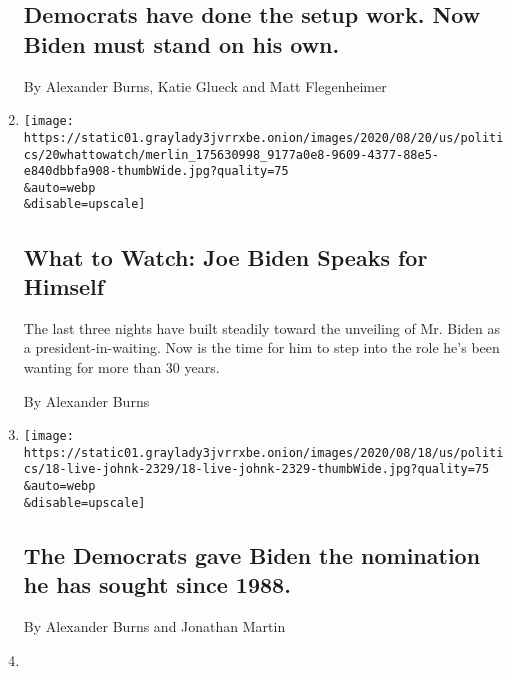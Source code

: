 \begin{enumerate}
  \hypertarget{democrats-have-done-the-setup-work-now-biden-must-stand-on-his-own}{%
  \subsection{Democrats have done the setup work. Now Biden must stand
  on his
  own.}\label{democrats-have-done-the-setup-work-now-biden-must-stand-on-his-own}}

  By Alexander Burns, Katie Glueck and Matt Flegenheimer
\item
  \href{/2020/08/20/us/politics/democratic-national-convention-guide.html}{}

  \texttt{[image: https://static01.graylady3jvrrxbe.onion/images/2020/08/20/us/politics/20whattowatch/merlin\_175630998\_9177a0e8-9609-4377-88e5-e840dbbfa908-thumbWide.jpg?quality=75\\\&auto=webp\\\&disable=upscale]}

  \hypertarget{what-to-watch-joe-biden-speaks-for-himself-1}{%
  \subsection{What to Watch: Joe Biden Speaks for
  Himself}\label{what-to-watch-joe-biden-speaks-for-himself-1}}

  The last three nights have built steadily toward the unveiling of Mr.
  Biden as a president-in-waiting. Now is the time for him to step into
  the role he's been wanting for more than 30 years.

  By Alexander Burns
\item
  \href{/2020/08/19/us/elections/the-democrats-gave-biden-the-nomination-he-has-sought-since-1988.html}{}

  \texttt{[image: https://static01.graylady3jvrrxbe.onion/images/2020/08/18/us/politics/18-live-johnk-2329/18-live-johnk-2329-thumbWide.jpg?quality=75\\\&auto=webp\\\&disable=upscale]}

  \hypertarget{the-democrats-gave-biden-the-nomination-he-has-sought-since-1988}{%
  \subsection{The Democrats gave Biden the nomination he has sought
  since
  1988.}\label{the-democrats-gave-biden-the-nomination-he-has-sought-since-1988}}

  By Alexander Burns and Jonathan Martin
\item
  \href{/live/2020/08/18/us/dnc-convention-election/the-democrats-gave-biden-the-nomination-he-has-sought-since-1988}{}


\end{enumerate}
